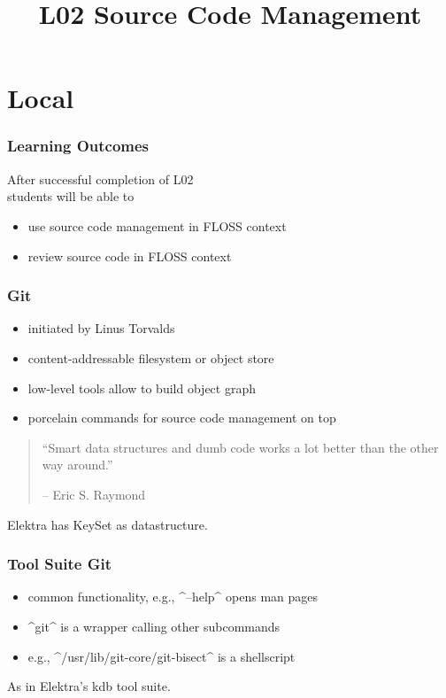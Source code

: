 

\title{L02 Source Code Management}



\section{Local}

\begin{frame}
	\frametitle{Learning Outcomes}
	After successful completion of L02 \\
	students will be able to

	\begin{itemize}
	\item use source code management in FLOSS context
	\item review source code in FLOSS context
	\end{itemize}
\end{frame}

\begin{frame}
	\frametitle{Git}

	\begin{itemize}
		\item initiated by Linus Torvalds
		\item content-addressable filesystem or object store
		\item low-level tools allow to build object graph
		\item porcelain commands for source code management on top
	\end{itemize}
	\vspace{1cm}

	\begin{quote}
	``Smart data structures and dumb code works a lot better than the other way around.''

	-- Eric S. Raymond
	\end{quote}
	\vspace{1cm}

	Elektra has KeySet as datastructure.
\end{frame}

\begin{frame}[fragile]
	\frametitle{Tool Suite Git}

	\begin{itemize}
		\item common functionality, e.g., ^--help^ opens man pages
		\item ^git^ is a wrapper calling other subcommands
		\item e.g., ^/usr/lib/git-core/git-bisect^ is a shellscript
	\end{itemize}
	\vspace{1cm}

	As in Elektra's kdb tool suite.
\end{frame}

